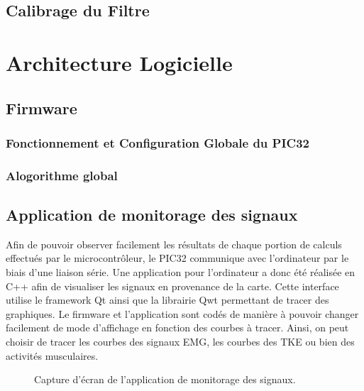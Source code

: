 \documentclass[letterpaper, twoside, 12pt, memoire, creativecommons, hyperref]{thETS}
\begin{document}
\subsection{Calibrage du Filtre}

\section{Architecture Logicielle}

\subsection{Firmware}

\subsubsection{Fonctionnement et Configuration Globale du PIC32}

\subsubsection{Alogorithme global}

\subsection{Application de monitorage des signaux}

Afin de pouvoir observer facilement les résultats de chaque portion de calculs effectués par le microcontrôleur, le PIC32 communique avec l’ordinateur par le biais d’une liaison série. 
Une application pour l’ordinateur a donc été réalisée en C++ afin de visualiser les signaux en provenance de la carte. Cette interface utilise le framework Qt ainsi que la librairie Qwt permettant de tracer des graphiques. 
Le firmware et l’application sont codés de manière à pouvoir changer facilement de mode d’affichage en fonction des courbes à tracer. Ainsi, on peut choisir de tracer les courbes des signaux EMG, les courbes des TKE ou bien des activités musculaires.      

\begin{figure}
	\centering
	\caption{Capture d'écran de l'application de monitorage des signaux.}
	\label{fig:desktop1}
\end{figure}
\end{document}
